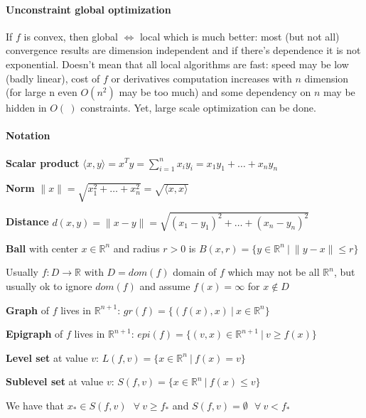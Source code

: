 \documentclass[10pt]{report}
\begin{document}
\paragraph{Unconstraint global optimization} If $f$ is convex, then global $\Leftrightarrow$ local which is much better: most (but not all) convergence results are dimension independent and if there's dependence it is not exponential. Doesn't mean that all local algorithms are fast: speed may be low (badly linear), cost of $f$ or derivatives computation increases with $n$ dimension (for large n even $O(n^2)$ may be too much) and some dependency on $n$ may be hidden in $O(\:)$ constraints. Yet, large scale optimization can be done.
\paragraph{Notation}\begin{list}{}{}
	\item \textbf{Scalar product} $\langle x,y\rangle = x^Ty = \sum_{i=1}^n x_iy_i = x_1y_1+\ldots+x_ny_n$
	\item \textbf{Norm} $\|x\| = \sqrt{x_1^2+\ldots+x_n^2} = \sqrt{\langle x,x\rangle}$
	\item \textbf{Distance} $d(x,y) = \|x-y\| = \sqrt{(x_1-y_1)^2+\ldots+(x_n-y_n)^2}$
	\item \textbf{Ball} with center $x\in \mathbb{R}^n$ and radius $r > 0$ is $B(x,r) = \{y\in \mathbb{R}^n\:|\:\|y-x\|\leq r\}$
\end{list}
Usually $f:D\rightarrow \mathbb{R}$ with $D = dom(f)$ domain of $f$ which may not be all $\mathbb{R}^n$, but usually ok to ignore $dom(f)$ and assume $f(x)=\infty$ for $x\not\in D$
\begin{list}{}{}
	\item \textbf{Graph} of $f$ lives in $\mathbb{R}^{n+1}$: $gr(f) = \{(f(x),x)\:|\:x\in \mathbb{R}^n\}$
	\item \textbf{Epigraph} of $f$ lives in $\mathbb{R}^{n+1}$: $epi(f)=\{(v,x) \in \mathbb{R}^{n+1}\:|\:v\geq f(x)\}$
	\item \textbf{Level set} at value $v$: $L(f,v)=\{x\in \mathbb{R}^n\:|\:f(x)=v\}$
	\item \textbf{Sublevel set} at value $v$: $S(f,v)=\{x\in \mathbb{R}^n\:|\:f(x)\leq v\}$
\end{list}
We have that $x_* \in S(f,v)\:\:\:\forall\:v\geq f_*$ and $S(f,v) = \emptyset\:\:\:\forall\:v<f_*$
\end{document}
